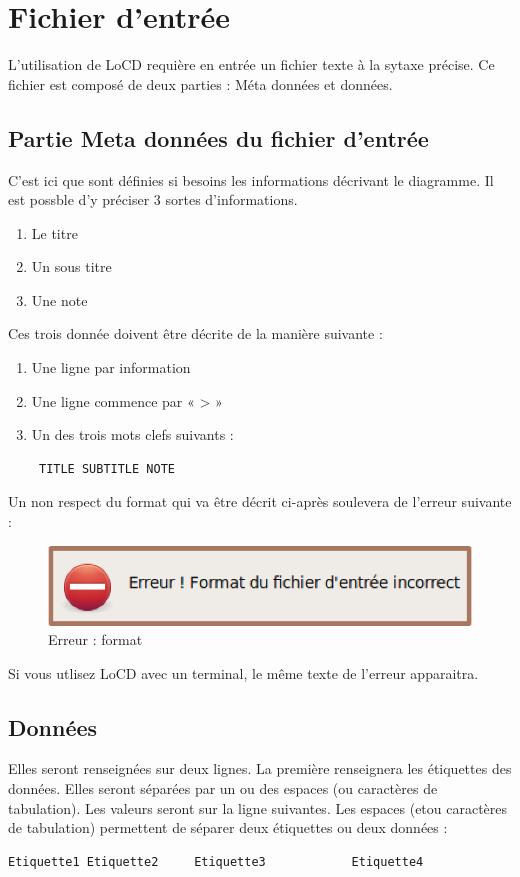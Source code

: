 \chapter{Fichier d'entrée}
\label{chap:fichDonnees}
L'utilisation de LoCD requière en entrée un fichier texte à la sytaxe précise. Ce fichier est composé de deux parties : Méta données et données.
\section{Partie Meta données du fichier d'entrée}
C'est ici que sont définies si besoins les informations décrivant le diagramme. Il est possble d'y préciser 3 sortes d'informations. 
\begin{enumerate}
\item
  Le titre 
\item
  Un sous titre
\item
  Une note
\end{enumerate}
Ces trois donnée doivent être décrite de la manière suivante : 
\begin{enumerate}
\item
  Une ligne par information 
\item
  Une ligne commence par  « > »
\item
  Un des trois mots clefs suivants : \begin{verbatim} TITLE SUBTITLE NOTE \end{verbatim}
\end{enumerate}
Un non respect du format qui va être décrit ci-après soulevera de l'erreur suivante  : 
\begin{figure}[htbp]
  \centering
  \includegraphics[scale=0.40]{img/eformatfichier}
  \caption{Erreur : format}
  \label{fig:enbdonees}
\end{figure}
Si vous utlisez LoCD avec un terminal, le même texte de l'erreur apparaitra.



\section{Données}
Elles seront renseignées sur deux lignes. La première renseignera les étiquettes des données. Elles seront séparées par un ou des espaces (ou caractères de tabulation). Les valeurs seront sur la ligne suivantes. Les espaces (et\/ou caractères de tabulation) permettent de séparer deux étiquettes ou deux données :
\begin{verbatim}
Etiquette1 Etiquette2     Etiquette3 			Etiquette4
 \end{verbatim} 
 
